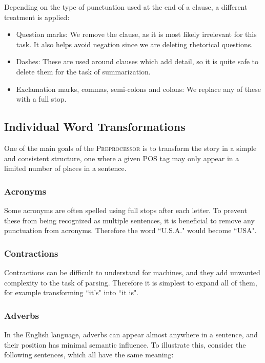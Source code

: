 Depending on the type of punctuation used at the end of a clause, a different treatment is applied:
\begin{itemize}[nolistsep]
\item Question marks: We remove the clause, as it is most likely irrelevant for this task. It also helps avoid negation since we are deleting rhetorical questions.
\item Dashes: These are used around clauses which add detail, so it is quite safe to delete them for the task of summarization.
\item Exclamation marks, commas, semi-colons and colons: We replace any of these with a full stop.
\end{itemize}

\subsection{Individual Word Transformations}

One of the main goals of the \textsc{Preprocessor} is to transform the story in a simple and consistent structure, one where a given POS tag may only appear in a limited number of places in a sentence.

\subsubsection{Acronyms}

Some acronyms are often spelled using full stops after each letter. To prevent these from being recognized as multiple sentences, it is beneficial to remove any punctuation from acronyms. Therefore the word ``U.S.A." would become ``USA".

\subsubsection{Contractions}

Contractions can be difficult to understand for machines, and they add unwanted complexity to the task of parsing. Therefore it is simplest to expand all of them, for example transforming ``it's" into ``it is".

\subsubsection{Adverbs}

In the English language, adverbs can appear almost anywhere in a sentence, and their position has minimal semantic influence. To illustrate this, consider the following sentences, which all have the same meaning:

